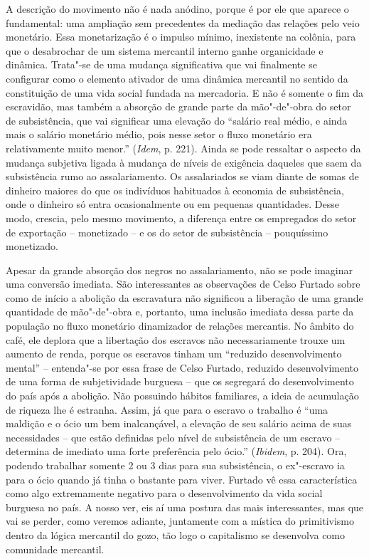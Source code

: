 A descrição do movimento não é nada anódino, porque é por ele que
aparece o fundamental: uma ampliação sem precedentes da mediação das
relações pelo veio monetário. Essa monetarização é o impulso mínimo,
inexistente na colônia, para que o desabrochar de um sistema mercantil
interno ganhe organicidade e dinâmica. Trata"-se de uma mudança
significativa que vai finalmente se configurar como o elemento ativador
de uma dinâmica mercantil no sentido da constituição de uma vida social
fundada na mercadoria. E não é somente o fim da escravidão, mas também a
absorção de grande parte da mão"-de"-obra do setor de subsistência, que
vai significar uma elevação do ``salário real médio, e ainda mais o
salário monetário médio, pois nesse setor o fluxo monetário era
relativamente muito menor.'' (\emph{Idem}, p. 221). Ainda se pode
ressaltar o aspecto da mudança subjetiva ligada à mudança de níveis de
exigência daqueles que saem da subsistência rumo ao assalariamento. Os
assalariados se viam diante de somas de dinheiro maiores do que os
indivíduos habituados à economia de subsistência, onde o dinheiro só
entra ocasionalmente ou em pequenas quantidades. Desse modo, crescia,
pelo mesmo movimento, a diferença entre os empregados do setor de
exportação -- monetizado -- e os do setor de subsistência -- pouquíssimo
monetizado.

Apesar da grande absorção dos negros no assalariamento, não se pode
imaginar uma conversão imediata. São interessantes as
observações de Celso Furtado sobre como de início a abolição da
escravatura não significou a liberação de uma grande quantidade de
mão"-de"-obra e, portanto, uma inclusão imediata dessa parte da população
no fluxo monetário dinamizador de relações mercantis. No âmbito do café,
ele deplora que a libertação dos escravos não necessariamente trouxe um
aumento de renda, porque os escravos tinham um ``reduzido
desenvolvimento mental'' -- entenda"-se por essa frase de Celso Furtado,
reduzido desenvolvimento de uma forma de subjetividade burguesa -- que
os segregará do desenvolvimento do país após a abolição. Não possuindo
hábitos familiares, a ideia de acumulação de riqueza lhe é estranha.
Assim, já que para o escravo o trabalho é ``uma maldição e o ócio um bem
inalcançável, a elevação de seu salário acima de suas necessidades --
que estão definidas pelo nível de subsistência de um escravo --
determina de imediato uma forte preferência pelo ócio.'' (\emph{Ibidem},
p. 204). Ora, podendo trabalhar somente 2 ou 3 dias para sua
subsistência, o ex"-escravo ia para o ócio quando já tinha o bastante
para viver. Furtado vê essa característica como algo extremamente
negativo para o desenvolvimento da vida social burguesa no país. A nosso
ver, eis aí uma postura das mais interessantes, mas que vai se perder,
como veremos adiante, juntamente com a mística do primitivismo dentro da
lógica mercantil do gozo, tão logo o capitalismo se desenvolva como
comunidade mercantil.

